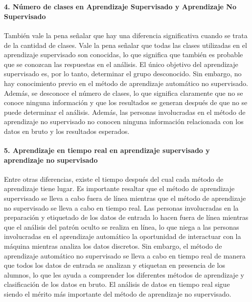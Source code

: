 \documentclass[%
 reprint,
 amsmath,amssymb,
 aps,
]{revtex4-1}
\begin{document}
\textbf{}\\  
\textbf{}\\ 
\textbf{4. Número de clases en Aprendizaje Supervisado y Aprendizaje No Supervisado}\\   
\textbf{}\\ 
También vale la pena señalar que hay una diferencia significativa cuando se trata de la cantidad de clases. Vale la pena señalar que todas las clases utilizadas en el aprendizaje supervisado son conocidas, lo que significa que también es probable que se conozcan las respuestas en el análisis. El único objetivo del aprendizaje supervisado es, por lo tanto, determinar el grupo desconocido. Sin embargo, no hay conocimiento previo en el método de aprendizaje automático no supervisado. Además, se desconoce el número de clases, lo que significa claramente que no se conoce ninguna información y que los resultados se generan después de que no se puede determinar el análisis. Además, las personas involucradas en el método de aprendizaje no supervisado no conocen ninguna información relacionada con los datos en bruto y los resultados esperados.
\textbf{}\\  
\textbf{}\\ 
\textbf{5. Aprendizaje en tiempo real en aprendizaje supervisado y aprendizaje no supervisado}\\   
\textbf{}\\ 
Entre otras diferencias, existe el tiempo después del cual cada método de aprendizaje tiene lugar. Es importante resaltar que el método de aprendizaje supervisado se lleva a cabo fuera de línea mientras que el método de aprendizaje no supervisado se lleva a cabo en tiempo real. Las personas involucradas en la preparación y etiquetado de los datos de entrada lo hacen fuera de línea mientras que el análisis del patrón oculto se realiza en línea, lo que niega a las personas involucradas en el aprendizaje automático la oportunidad de interactuar con la máquina mientras analiza los datos discretos. Sin embargo, el método de aprendizaje automático no supervisado se lleva a cabo en tiempo real de manera que todos los datos de entrada se analizan y etiquetan en presencia de los alumnos, lo que les ayuda a comprender los diferentes métodos de aprendizaje y clasificación de los datos en bruto. El análisis de datos en tiempo real sigue siendo el mérito más importante del método de aprendizaje no supervisado.
\end{document}
